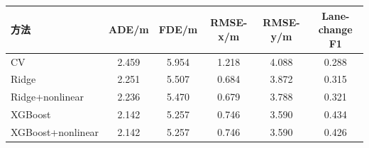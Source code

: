 \begin{tabular}{lccccc}
\toprule
方法 & ADE/m & FDE/m & RMSE-x/m & RMSE-y/m & Lane-change F1 \\ 
\midrule
CV & 2.459 & 5.954 & 1.218 & 4.088 & 0.288 \\ 
Ridge & 2.251 & 5.507 & 0.684 & 3.872 & 0.315 \\ 
Ridge+nonlinear & 2.236 & 5.470 & 0.679 & 3.788 & 0.321 \\ 
XGBoost & 2.142 & 5.257 & 0.746 & 3.590 & 0.434 \\ 
XGBoost+nonlinear & 2.142 & 5.257 & 0.746 & 3.590 & 0.426 \\ 
\bottomrule
\end{tabular}
